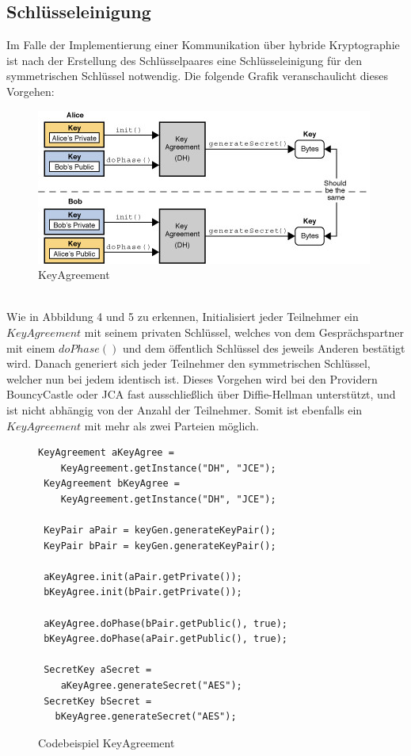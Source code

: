 \documentclass[paper=a4,11pt,german]{scrartcl} %
\begin{document}
\subsection{Schlüsseleinigung}
Im Falle der Implementierung einer Kommunikation über hybride Kryptographie ist nach der Erstellung des Schlüsselpaares eine Schlüsseleinigung für den symmetrischen Schlüssel notwendig. Die folgende Grafik veranschaulicht dieses Vorgehen:

\begin{figure}[htb]
	\centering
	\includegraphics[width=\textwidth]{KeyAgreement.jpeg}   
	\caption{KeyAgreement}
	\label{KeyAgreement}
\end{figure}\ \\
Wie in Abbildung 4  und 5 zu erkennen, Initialisiert jeder Teilnehmer ein $KeyAgreement$ mit seinem privaten Schlüssel, welches von dem Gesprächspartner mit einem $doPhase()$ und dem öffentlich Schlüssel des jeweils Anderen bestätigt wird. Danach generiert sich jeder Teilnehmer den symmetrischen Schlüssel, welcher nun bei jedem identisch ist. Dieses Vorgehen wird bei den Providern BouncyCastle oder JCA fast ausschließlich über Diffie-Hellman unterstützt, und ist nicht abhängig von der Anzahl der Teilnehmer. Somit ist ebenfalls ein $KeyAgreement$ mit mehr als zwei Parteien möglich.
\newpage
\begin{figure}[h]
\caption{Codebeispiel KeyAgreement}
\begin{lstlisting}[frame=shadowbox]
 KeyAgreement aKeyAgree =
  	KeyAgreement.getInstance("DH", "JCE");
 KeyAgreement bKeyAgree = 
  	KeyAgreement.getInstance("DH", "JCE");
   
 KeyPair aPair = keyGen.generateKeyPair();
 KeyPair bPair = keyGen.generateKeyPair();

 aKeyAgree.init(aPair.getPrivate());
 bKeyAgree.init(bPair.getPrivate());
 
 aKeyAgree.doPhase(bPair.getPublic(), true);
 bKeyAgree.doPhase(aPair.getPublic(), true);

 SecretKey aSecret =
   	aKeyAgree.generateSecret("AES");
 SecretKey bSecret =
   bKeyAgree.generateSecret("AES");
\end{lstlisting}
\label{KeyAgree}
\end{figure}
\end{document}
